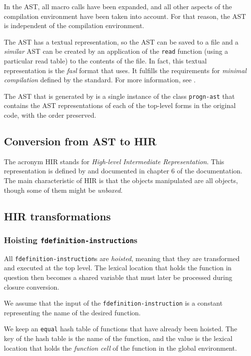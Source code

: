 In the AST, all macro calls have been expanded, and all other aspects
of the compilation environment have been taken into account.  For that
reason, the AST is independent of the compilation environment.

The AST has a textual representation, so the AST can be saved to a
file and a \emph{similar} AST can be created by an application of the
\texttt{read} function (using a particular read table) to the contents
of the file.  In fact, this textual representation is the \emph{fasl}
format that \sysname{} uses.  It fulfills the requirements for
\emph{minimal compilation} defined by the \commonlisp{} standard.
For more information, see .

The AST that is generated by \cleavir{} is a single instance of the
class \texttt{progn-ast} that contains the AST representations of each
of the top-level forms in the original code, with the order preserved.

\subsection{Conversion from AST to HIR}

The acronym HIR stands for \emph{High-level Intermediate
  Representation}.  This representation is defined by \cleavir{} and
documented in chapter 6 of the \cleavir{} documentation.
The main characteristic of HIR is that the objects manipulated are all
\commonlisp{} objects, though some of them might be \emph{unboxed}.

\subsection{HIR transformations}

\subsubsection{Hoisting \texttt{fdefinition-instruction}s}

All \texttt{fdefinition-instruction}s are \emph{hoisted}, meaning that
they are transformed and executed at the top level.  The lexical
location that holds the function in question then becomes a shared
variable that must later be processed during closure conversion.

We assume that the input of the \texttt{fdefinition-instruction} is a
constant representing the name of the desired function.

We keep an \texttt{equal} hash table of functions that have already
been hoisted.  The key of the hash table is the name of the function,
and the value is the lexical location that holds the \emph{function
  cell} of the function in the global environment.

